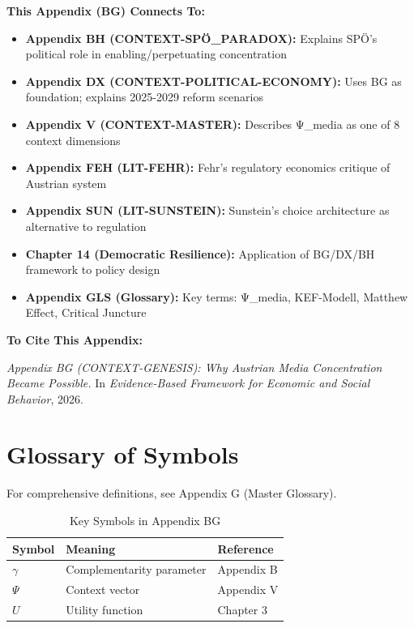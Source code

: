 {\begin{tcolorbox}[colback=orange!5!white, colframe=orange!75!black,
    title=Cross-Reference Links]

\textbf{This Appendix (BG) Connects To:}

\begin{itemize}[nosep]
\item \textbf{Appendix BH (CONTEXT-SPÖ_PARADOX):} Explains SPÖ's political role in enabling/perpetuating concentration
\item \textbf{Appendix DX (CONTEXT-POLITICAL-ECONOMY):} Uses BG as foundation; explains 2025-2029 reform scenarios
\item \textbf{Appendix V (CONTEXT-MASTER):} Describes Ψ_media as one of 8 context dimensions
\item \textbf{Appendix FEH (LIT-FEHR):} Fehr's regulatory economics critique of Austrian system
\item \textbf{Appendix SUN (LIT-SUNSTEIN):} Sunstein's choice architecture as alternative to regulation
\item \textbf{Chapter 14 (Democratic Resilience):} Application of BG/DX/BH framework to policy design
\item \textbf{Appendix GLS (Glossary):} Key terms: Ψ_media, KEF-Modell, Matthew Effect, Critical Juncture
\end{itemize}

\textbf{To Cite This Appendix:}

\textit{Appendix BG (CONTEXT-GENESIS): Why Austrian Media Concentration Became Possible.}
In \textit{Evidence-Based Framework for Economic and Social Behavior}, 2026.

\end{tcolorbox}



\section{Glossary of Symbols}
\label{sec:bg-glossary}

For comprehensive definitions, see Appendix G (Master Glossary).

\begin{table}[htbp]
\centering
\caption{Key Symbols in Appendix BG}
\begin{tabular}{lll}
\toprule
\textbf{Symbol} & \textbf{Meaning} & \textbf{Reference} \\
\midrule
$\gamma$ & Complementarity parameter & Appendix B \\
$\Psi$ & Context vector & Appendix V \\
$U$ & Utility function & Chapter 3 \\
\bottomrule
\end{tabular}
\end{table}


}
